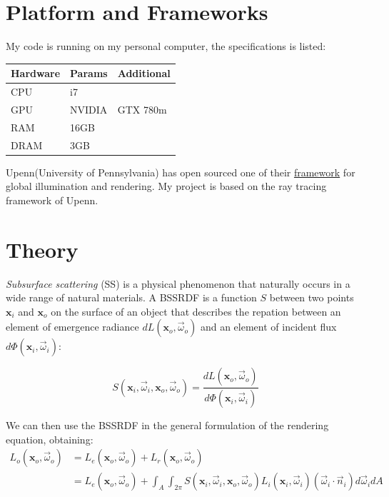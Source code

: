 \documentclass[11pt]{article}
\begin{document}
\section{Platform and Frameworks}
\label{sec:orgheadline3}

My code is running on my personal computer, the specifications is listed:
\begin{center}
\begin{tabular}{lll}
\hline
\hline
Hardware & Params & Additional\\
\hline
CPU & i7 & \\
GPU & NVIDIA & GTX 780m\\
RAM & 16GB & \\
DRAM & 3GB & \\
\hline
\end{tabular}
\end{center}

Upenn(University of Pennsylvania) has open sourced one of their \href{https://cis565-fall-2015.github.io/}{framework}  for 
global illumination and rendering. My project is based on the ray tracing framework
of Upenn.

\section{Theory}
\label{sec:orgheadline4}

{\it Subsurface scattering} (SS) is a physical phenomenon that naturally occurs in a wide range of natural materials.
A BSSRDF is a function $S$ between two points $\mathbf{x}_i$ and $\mathbf{x}_o$ on the surface of an object
 that describes the repation between an element of emergence radiance $dL(\mathbf{x}_o, \vec{\omega}_o)$ and an 
element of incident flux $d\Phi(\mathbf{x}_i,\vec{\omega}_i)$:

$$
S(\mathbf{x}_i, \vec{\omega}_i,\mathbf{x}_o, \vec{\omega}_o) = \frac{dL(\mathbf{x}_o, \vec{\omega}_o)}{d\Phi(\mathbf{x}_i,\vec{\omega}_i)}
$$

We can then use the BSSRDF in the general formulation of the rendering equation, obtaining:
\begin{equation}
\label{eq:eq1}
\begin{aligned}
L_o(\mathbf{x}_o, \vec{\omega}_o) &= L_e(\mathbf{x}_o, \vec{\omega}_o) + L_r(\mathbf{x}_o, \vec{\omega}_o) \\
&= L_e(\mathbf{x}_o, \vec{\omega}_o) + \int_A \int_{2\pi} S(\mathbf{x}_i, \vec{\omega}_i,\mathbf{x}_o, \vec{\omega}_o) L_i(\mathbf{x}_i, \vec{\omega}_i)(\vec{\omega}_i \cdot \vec{n}_i) d\vec{\omega}_i dA
\end{aligned}
\end{equation}
\end{document}
